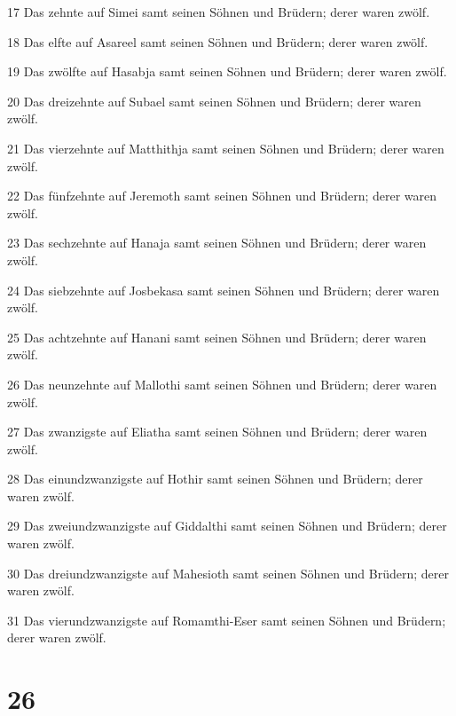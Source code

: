 \par 17 Das zehnte auf Simei samt seinen Söhnen und Brüdern; derer waren zwölf.
\par 18 Das elfte auf Asareel samt seinen Söhnen und Brüdern; derer waren zwölf.
\par 19 Das zwölfte auf Hasabja samt seinen Söhnen und Brüdern; derer waren zwölf.
\par 20 Das dreizehnte auf Subael samt seinen Söhnen und Brüdern; derer waren zwölf.
\par 21 Das vierzehnte auf Matthithja samt seinen Söhnen und Brüdern; derer waren zwölf.
\par 22 Das fünfzehnte auf Jeremoth samt seinen Söhnen und Brüdern; derer waren zwölf.
\par 23 Das sechzehnte auf Hanaja samt seinen Söhnen und Brüdern; derer waren zwölf.
\par 24 Das siebzehnte auf Josbekasa samt seinen Söhnen und Brüdern; derer waren zwölf.
\par 25 Das achtzehnte auf Hanani samt seinen Söhnen und Brüdern; derer waren zwölf.
\par 26 Das neunzehnte auf Mallothi samt seinen Söhnen und Brüdern; derer waren zwölf.
\par 27 Das zwanzigste auf Eliatha samt seinen Söhnen und Brüdern; derer waren zwölf.
\par 28 Das einundzwanzigste auf Hothir samt seinen Söhnen und Brüdern; derer waren zwölf.
\par 29 Das zweiundzwanzigste auf Giddalthi samt seinen Söhnen und Brüdern; derer waren zwölf.
\par 30 Das dreiundzwanzigste auf Mahesioth samt seinen Söhnen und Brüdern; derer waren zwölf.
\par 31 Das vierundzwanzigste auf Romamthi-Eser samt seinen Söhnen und Brüdern; derer waren zwölf.

\chapter{26}

